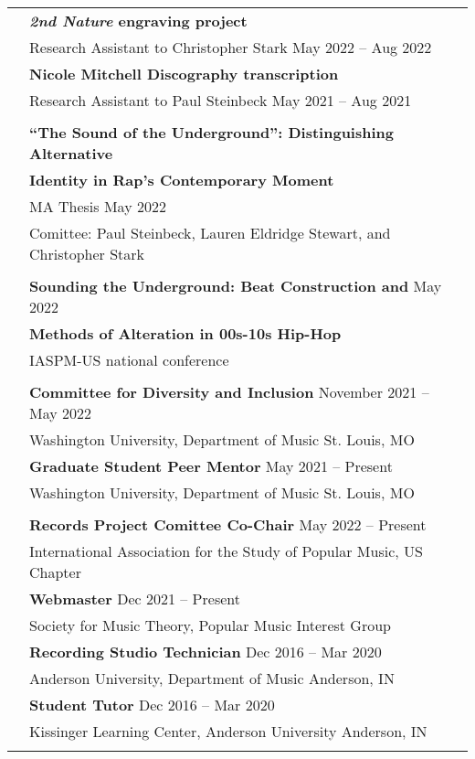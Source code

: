 \documentclass[letterpaper, 11pt]{article}
\begin{document}
\begin{longtable}{p{1.3in}p{4.8in}}
\nohyphens{\color{OliveGreen}{Research Projects}} 
& \textbf{\textit{2nd Nature} engraving project} \\
& Research Assistant to Christopher Stark \hfill May 2022 -- Aug 2022 \\
& \textbf{Nicole Mitchell Discography transcription} \\
& Research Assistant to Paul Steinbeck \hfill May 2021 -- Aug 2021 \\
& \\

\nohyphens{\color{OliveGreen}{Writing Projects}} 
& \textbf{``The Sound of the Underground'': Distinguishing Alternative}  \\
& \textbf{ Identity in Rap's Contemporary Moment} \\
& MA Thesis \hfill{May 2022} \\
& Comittee: Paul Steinbeck, Lauren Eldridge Stewart, and Christopher Stark \\
& \\

{\color{OliveGreen}{Presentations}} 
& \textbf{Sounding the Underground: Beat Construction and} \hfill May 2022 \\
{\color{OliveGreen}{\& Lectures}} 
& \textbf{Methods of Alteration in 00s-10s Hip-Hop} \\
& IASPM-US national conference \\
& \\

\newpage
\color{OliveGreen}{University Service}
& \textbf{Committee for Diversity and Inclusion} \hfill November 2021 -- May 2022 \\
& Washington University, Department of Music \hfill St. Louis, MO\\
& \textbf{Graduate Student Peer Mentor} \hfill May 2021  -- Present \\
& Washington University, Department of Music \hfill St. Louis, MO\\
& \\

{\color{OliveGreen}{Professional Service}}
& \textbf{Records Project Comittee Co-Chair} \hfill May 2022  -- Present \\
& International Association for the Study of Popular Music, US Chapter\\
& \textbf{Webmaster} \hfill Dec 2021  -- Present \\
& Society for Music Theory, Popular Music Interest Group\\
& \textbf{Recording Studio Technician} \hfill Dec 2016 -- Mar 2020 \\
&  Anderson University, Department of Music \hfill Anderson, IN \\
& \textbf{Student Tutor} \hfill Dec 2016 -- Mar 2020 \\
& Kissinger Learning Center, Anderson University \hfill Anderson, IN \\
& \\


\end{longtable}
\end{document}

